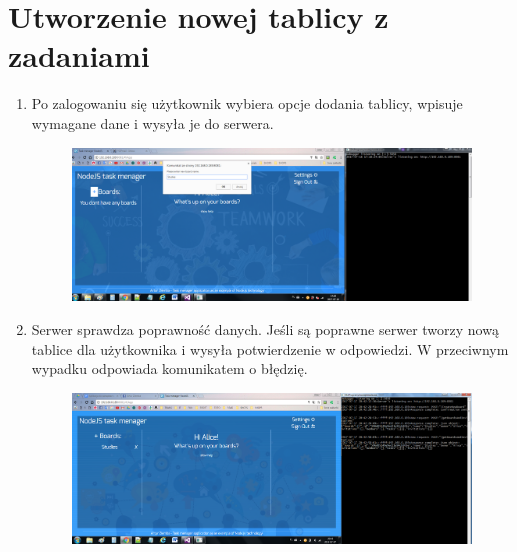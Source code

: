 \documentclass[12pt]{report}
\begin{document}
\section{Utworzenie nowej tablicy z zadaniami}
\begin{enumerate}
\item Po zalogowaniu się użytkownik wybiera opcje dodania tablicy, wpisuje wymagane dane i wysyła je do serwera.
\begin{figure}[!hb]
\centering
\includegraphics[width=\textwidth,height=\textheight,keepaspectratio]{71.png}
\end{figure}
\item Serwer sprawdza poprawność danych. 
Jeśli są poprawne serwer tworzy nową tablice dla użytkownika i wysyła potwierdzenie w odpowiedzi.
W przeciwnym wypadku odpowiada komunikatem o błędzię.
\begin{figure}[!hb]
\centering
\includegraphics[width=\textwidth,height=\textheight,keepaspectratio]{72.png}
\end{figure}
\end{enumerate}
\end{document}

